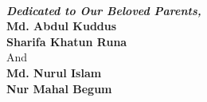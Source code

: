 \begin{titlepage}
\begin{center}
%
\vspace*{0.5cm}
%
\noindent{\large \textbf{\textcolor{white}{Project / Thesis for the B.Sc (Honors) in CSE}}}\\
\vspace*{1.2cm}
%
\vspace*{5.5cm}
%

\begin{center}
    \noindent
    \large \emph{\textbf{Dedicated to Our Beloved Parents,}}\\[0.3cm]
    \large \textbf{Md. Abdul Kuddus}\\
    \large \textbf{Sharifa Khatun Runa}\\[0.4cm]
    \large And\\[0.4cm]
    \large \textbf{Md. Nurul Islam}\\
    \large \textbf{Nur Mahal Begum}
\end{center}

\vspace*{4.5cm}
%
\end{center}
\end{titlepage}
\sloppy
%
\titlepage
%
